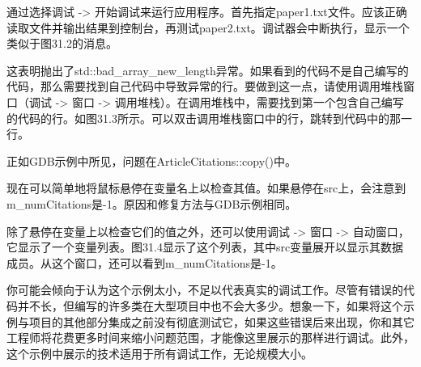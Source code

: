 通过选择调试 -> 开始调试来运行应用程序。首先指定paper1.txt文件。应该正确读取文件并输出结果到控制台，再测试paper2.txt。调试器会中断执行，显示一个类似于图31.2的消息。


这表明抛出了std::bad\_array\_new\_length异常。如果看到的代码不是自己编写的代码，那么需要找到自己代码中导致异常的行。要做到这一点，请使用调用堆栈窗口（调试 -> 窗口 -> 调用堆栈）。在调用堆栈中，需要找到第一个包含自己编写的代码的行。如图31.3所示。可以双击调用堆栈窗口中的行，跳转到代码中的那一行。


正如GDB示例中所见，问题在ArticleCitations::copy()中。

现在可以简单地将鼠标悬停在变量名上以检查其值。如果悬停在src上，会注意到m\_numCitations是-1。原因和修复方法与GDB示例相同。

除了悬停在变量上以检查它们的值之外，还可以使用调试 -> 窗口 -> 自动窗口，它显示了一个变量列表。图31.4显示了这个列表，其中src变量展开以显示其数据成员。从这个窗口，还可以看到m\_numCitations是-1。



你可能会倾向于认为这个示例太小，不足以代表真实的调试工作。尽管有错误的代码并不长，但编写的许多类在大型项目中也不会大多少。想象一下，如果将这个示例与项目的其他部分集成之前没有彻底测试它，如果这些错误后来出现，你和其它工程师将花费更多时间来缩小问题范围，才能像这里展示的那样进行调试。此外，这个示例中展示的技术适用于所有调试工作，无论规模大小。














